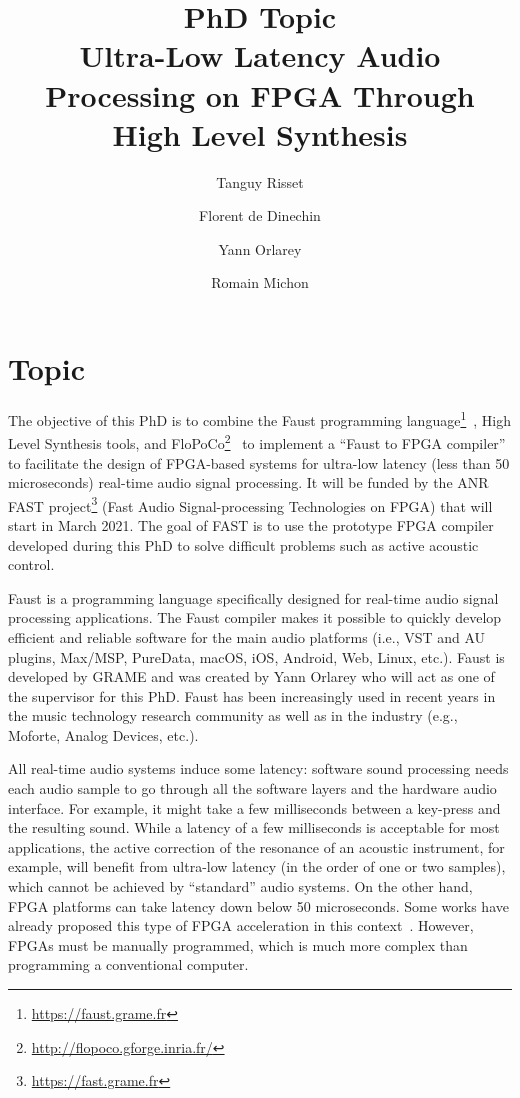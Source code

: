 \documentclass[a4paper,francais,11]{article}
\title{\textbf{PhD Topic}\\
  Ultra-Low Latency Audio Processing on FPGA Through High Level Synthesis}
\date{}
\author[1]{Tanguy Risset}
\author[1]{Florent de Dinechin}
\author[2]{Yann Orlarey}
\author[2]{Romain Michon}
\affil[1]{Citi/Socrate, Insa-Lyon, Inria~\url{https://team.inria.fr/socrate/} }
\affil[2]{GRAME-CNCM, Lyon~\url{http://www.grame.fr/}}
\begin{document}
\maketitle

\section*{Topic}

The objective of this PhD is to combine the Faust programming language\footnote{\url{https://faust.grame.fr}}~\cite{faust}, High Level Synthesis tools, and FloPoCo\footnote{\url{http://flopoco.gforge.inria.fr/}}~\cite{flopoco} to implement a ``Faust to FPGA compiler'' to facilitate the design of FPGA-based systems for ultra-low latency (less than 50 microseconds) real-time audio signal processing. It will be funded by the ANR FAST project\footnote{\url{https://fast.grame.fr}} (Fast Audio Signal-processing Technologies on FPGA) that will start in March 2021. The goal of FAST is to use the prototype FPGA compiler developed during this PhD to solve difficult problems such as active acoustic control.

Faust is a programming language specifically designed for real-time audio signal processing applications. The Faust compiler makes it possible to quickly develop efficient and reliable software for the main audio platforms (i.e., VST and AU plugins, Max/MSP, PureData, macOS, iOS, Android, Web, Linux, etc.). Faust is developed by GRAME and was created by Yann Orlarey who will act as one of the supervisor for this PhD. Faust has been increasingly used in recent years in the music technology research community as well as in the industry (e.g., Moforte, Analog Devices, etc.).

All real-time audio systems induce some latency: software sound processing needs each audio sample to go through all the software layers and the hardware audio interface. For example, it might take a few milliseconds between a key-press and the resulting sound. While a latency of a few milliseconds is acceptable for most applications, the active correction of the resonance of an acoustic instrument, for example, will benefit from ultra-low latency (in the order of one or two samples), which cannot be achieved by ``standard'' audio systems. On the other hand, FPGA platforms can take latency down below 50 microseconds. Some works have already proposed this type of FPGA acceleration in this context~\cite{Kuper}. However, FPGAs must be manually programmed, which is much more complex than programming a conventional computer.
\end{document}
